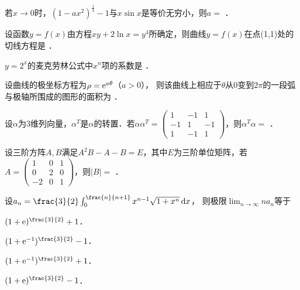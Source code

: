 \documentclass[plain,noanswer,medmath]{../../template/jnuexam}
\begin{document}






\begin{problem}
若$x \to 0$时，$(1 - ax^2)^{\frac{1}{4}} - 1$与$x\sin x$是等价无穷小，则$a =$ \fillin{}．
\end{problem}


\begin{problem}
设函数$y = f(x)$由方程$xy + 2\ln x = y^4$所确定，则曲线$y = f(x)$在点(1,1)处的切线方程是 \fillin{}．
\end{problem}


\begin{problem}
$y = 2^x$的麦克劳林公式中$x^n$项的系数是 \fillin{}．
\end{problem}


\begin{problem}
设曲线的极坐标方程为$\rho = \mathrm{e}^{a\theta}$（$a > 0$），
则该曲线上相应于$\theta$从$0$变到$2\pi$的一段弧与极轴所围成的图形的面积为 \fillin{}．
\end{problem}


\begin{problem}
设$\alpha$为$3$维列向量，$\alpha^T$是$\alpha$的转置．若$\alpha \alpha^T = \begin{pmatrix}
   1 & -1 & 1 \\
  -1 &  1 & -1 \\
   1 & -1 & 1
\end{pmatrix}$，则$\alpha^T\alpha =$ \fillin{}．
\end{problem}


\begin{problem}
设三阶方阵$A,B$满足$A^2 B - A - B = E$，其中$E$为三阶单位矩阵，若$A = \begin{pmatrix}
   1 & 0 & 1 \\
   0 & 2 & 0 \\
  -2 & 0 & 1
\end{pmatrix}$，则$|B| =$ \fillin{}．
\end{problem}






\begin{problem}
设$a_n = \frac{3}{2}\int_0^{\frac{n}{n + 1}} x^{n - 1} \sqrt{1 + x^n} \dx$，
则极限$\lim_{n \to \infty} na_n$等于\pickout{}
\begin{abcd}
\item $(1 + \e)^{\frac{3}{2}} + 1$．
\item $(1 + \e^{-1})^{\frac{3}{2}} - 1$．
\item $(1 + \e^{-1})^{\frac{3}{2}} + 1$．
\item $(1 + \e)^{\frac{3}{2}} - 1$．
\end{abcd}
\end{problem}
\end{document}
